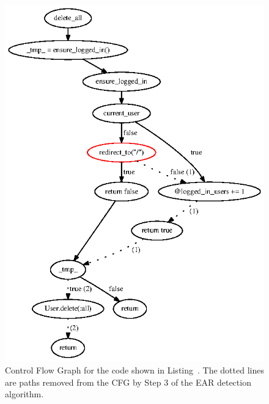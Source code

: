 \begin{figure}[tb]
  \centering
  \includegraphics{figures/complex_ear_diagram.ps}
  \caption{Control Flow Graph for the code shown in
    Listing~. The dotted lines are paths removed
    from the CFG by Step 3 of the EAR detection algorithm.}
\end{figure}
